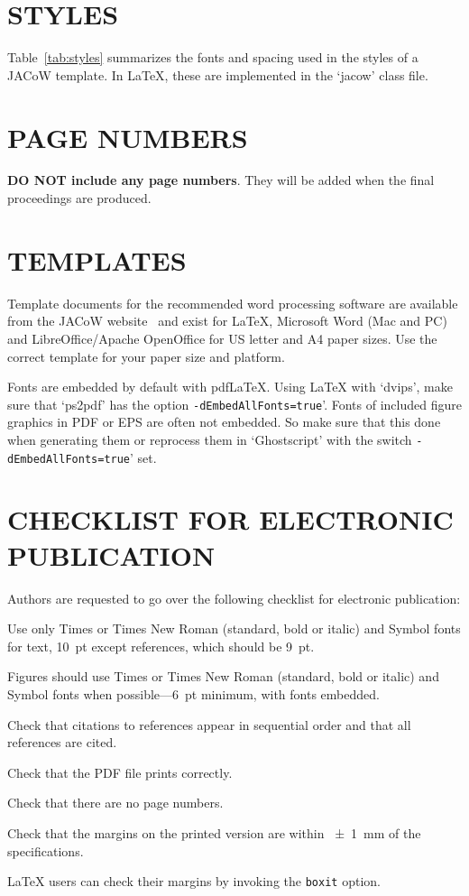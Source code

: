 \documentclass[letterpaper,
               nospread,     %
               ]{jacow}
\begin{document}
\section{STYLES}

Table~\ref{tab:styles} summarizes the fonts and spacing used in the styles of
a JACoW template. In \LaTeX, these 
are implemented in the ‘jacow’ class file.

\section{PAGE NUMBERS}

\textbf{DO NOT include any page numbers}. They will be added
when the final proceedings are produced.

\section{TEMPLATES}

Template documents for the recommended word processing
software are available from the JACoW website~\cite{jacow-help}
and exist for \LaTeX, Microsoft Word (Mac and PC)
and LibreOffice/Apache OpenOffice for US letter and A4
paper sizes. Use the correct template for your paper size and
platform.

Fonts are embedded by default with pdf\LaTeX. Using \LaTeX{} with `dvips', 
make sure that `ps2pdf' has the option \texttt{-dEmbedAllFonts=true}'.
Fonts of included figure graphics in PDF or EPS are often not embedded. 
So make sure that this done when generating them or reprocess them 
in `Ghostscript' with the switch \texttt{-dEmbedAllFonts=true}' set.

\flushcolsend

\section{CHECKLIST FOR ELECTRONIC PUBLICATION}
Authors are requested to go over the following checklist for electronic publication:
\begin{Itemize}
	\item  Use only Times or Times New Roman (standard, bold or italic) and Symbol
	fonts for text, \SI{10}{pt} except references, which should be \SI{9}{pt}.
	
	\item  Figures should use Times or Times New Roman (standard, bold or italic) and
	Symbol fonts when possible---\SI{6}{pt} minimum, with fonts embedded.
	\item  Check that citations to references appear in sequential order and
	that all references are cited.
	\item  Check that the PDF file prints correctly.
	\item  Check that there are no page numbers.
	\item  Check that the margins on the printed version are within \SI{\pm1}{mm}
	of the specifications.
	\item  \LaTeX{} users can check their margins by invoking the
	\texttt{boxit} option.
\end{Itemize}
\end{document}
